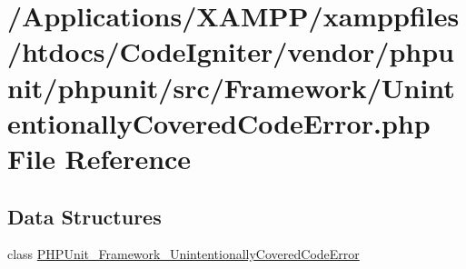 \hypertarget{_unintentionally_covered_code_error_8php}{}\section{/\+Applications/\+X\+A\+M\+P\+P/xamppfiles/htdocs/\+Code\+Igniter/vendor/phpunit/phpunit/src/\+Framework/\+Unintentionally\+Covered\+Code\+Error.php File Reference}
\label{_unintentionally_covered_code_error_8php}
\subsection*{Data Structures}
\begin{DoxyCompactItemize}
\item 
class \mbox{\hyperlink{class_p_h_p_unit___framework___unintentionally_covered_code_error}{P\+H\+P\+Unit\+\_\+\+Framework\+\_\+\+Unintentionally\+Covered\+Code\+Error}}
\end{DoxyCompactItemize}
